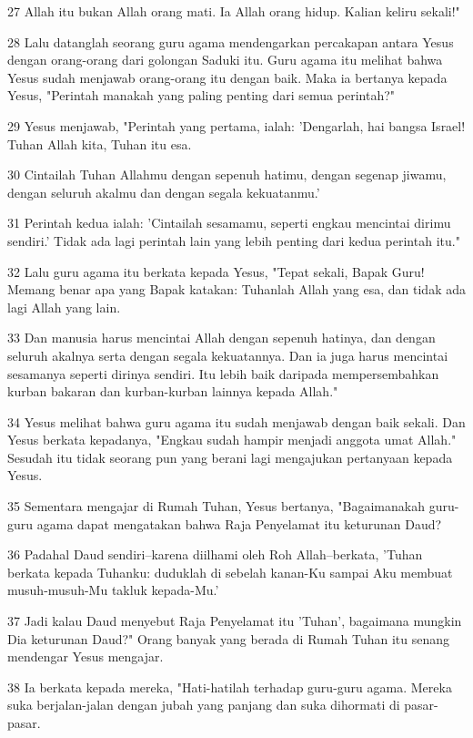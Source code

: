 \par 27 Allah itu bukan Allah orang mati. Ia Allah orang hidup. Kalian keliru sekali!"
\par 28 Lalu datanglah seorang guru agama mendengarkan percakapan antara Yesus dengan orang-orang dari golongan Saduki itu. Guru agama itu melihat bahwa Yesus sudah menjawab orang-orang itu dengan baik. Maka ia bertanya kepada Yesus, "Perintah manakah yang paling penting dari semua perintah?"
\par 29 Yesus menjawab, "Perintah yang pertama, ialah: 'Dengarlah, hai bangsa Israel! Tuhan Allah kita, Tuhan itu esa.
\par 30 Cintailah Tuhan Allahmu dengan sepenuh hatimu, dengan segenap jiwamu, dengan seluruh akalmu dan dengan segala kekuatanmu.'
\par 31 Perintah kedua ialah: 'Cintailah sesamamu, seperti engkau mencintai dirimu sendiri.' Tidak ada lagi perintah lain yang lebih penting dari kedua perintah itu."
\par 32 Lalu guru agama itu berkata kepada Yesus, "Tepat sekali, Bapak Guru! Memang benar apa yang Bapak katakan: Tuhanlah Allah yang esa, dan tidak ada lagi Allah yang lain.
\par 33 Dan manusia harus mencintai Allah dengan sepenuh hatinya, dan dengan seluruh akalnya serta dengan segala kekuatannya. Dan ia juga harus mencintai sesamanya seperti dirinya sendiri. Itu lebih baik daripada mempersembahkan kurban bakaran dan kurban-kurban lainnya kepada Allah."
\par 34 Yesus melihat bahwa guru agama itu sudah menjawab dengan baik sekali. Dan Yesus berkata kepadanya, "Engkau sudah hampir menjadi anggota umat Allah." Sesudah itu tidak seorang pun yang berani lagi mengajukan pertanyaan kepada Yesus.
\par 35 Sementara mengajar di Rumah Tuhan, Yesus bertanya, "Bagaimanakah guru-guru agama dapat mengatakan bahwa Raja Penyelamat itu keturunan Daud?
\par 36 Padahal Daud sendiri--karena diilhami oleh Roh Allah--berkata, 'Tuhan berkata kepada Tuhanku: duduklah di sebelah kanan-Ku sampai Aku membuat musuh-musuh-Mu takluk kepada-Mu.'
\par 37 Jadi kalau Daud menyebut Raja Penyelamat itu 'Tuhan', bagaimana mungkin Dia keturunan Daud?" Orang banyak yang berada di Rumah Tuhan itu senang mendengar Yesus mengajar.
\par 38 Ia berkata kepada mereka, "Hati-hatilah terhadap guru-guru agama. Mereka suka berjalan-jalan dengan jubah yang panjang dan suka dihormati di pasar-pasar.
